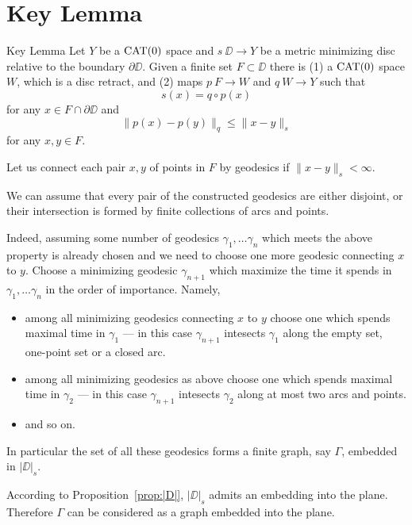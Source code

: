 \documentclass[a4paper,10pt]{amsart}
\begin{document}
\section{Key Lemma}


\begin{thm}{Key Lemma}\label{lem:key}
Let $Y$ be a $\mathop{\rm CAT}\nolimits(0)$ space and $s\:\DD\to Y$ 
be a metric minimizing disc relative to the boundary $\partial \DD$.
Given a finite set $F\subset \DD$
there is 
(1) a $\mathop{\rm CAT}\nolimits(0)$ space $W$, which is a disc retract,
and (2) maps $p\:F\to W$ and $q\:W\to Y$ such that
\[s(x)=q\circ p(x)\] 
for any $x\in F\cap \partial \DD$
and 
\[\|p(x)-p(y)\|_q\le \|x-y\|_s\] 
for any $x,y\in F$.
\end{thm}

Let us connect each pair $x,y$ of points in $F$ by geodesics
if $\|x-y\|_s<\infty$.

We can assume that 
every pair of the constructed geodesics 
are either disjoint, or their intersection is formed by finite collections of arcs and points.

Indeed, assuming some number of geodesics $\gamma_1,\dots\gamma_n$ which meets the above property is already chosen and we need to choose one more geodesic connecting $x$ to $y$.
Choose a minimizing geodesic $\gamma_{n+1}$ which maximize the time it spends in $\gamma_1,\dots\gamma_n$  in the order of importance.
Namely, 
\begin{itemize}
\item  among all minimizing geodesics connecting $x$ to $y$
choose one which spends maximal time in $\gamma_1$ --- in this case $\gamma_{n+1}$ intesects $\gamma_1$ along the empty set, one-point set or a closed arc.
\item among all minimizing geodesics as above
choose one which spends maximal time in $\gamma_2$ --- in this case $\gamma_{n+1}$ intesects $\gamma_2$ along at most two arcs and points.
\item and so on.
\end{itemize}


In particular the set of all these geodesics forms a finite graph, say $\Gamma$,
embedded in $|\DD|_s$. 

According to Proposition~\ref{prop:|D|},
$|\DD|_s$ admits an embedding into the plane.
Therefore $\Gamma$ can be considered as a graph embedded into the plane.
\end{document}
